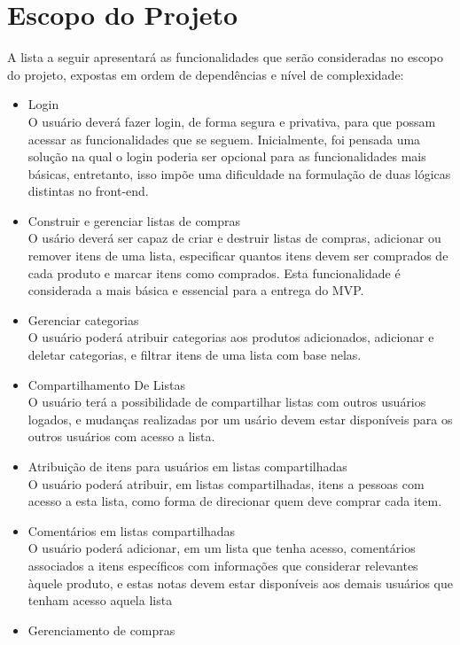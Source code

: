 \section{Escopo do Projeto}
A lista a seguir apresentará as funcionalidades que serão consideradas
no escopo do projeto, expostas em ordem de dependências e nível de
complexidade:
\begin{itemize}
\item Login\\
  O usuário deverá fazer login, de forma segura e privativa, para que
  possam acessar as funcionalidades que se seguem. Inicialmente, foi
  pensada uma solução na qual o login poderia ser opcional para as
  funcionalidades mais básicas, entretanto, isso impõe uma dificuldade
  na formulação de duas lógicas distintas no front-end.
\item Construir e gerenciar listas de compras\\
  O usário deverá ser capaz de criar e destruir listas de compras,
  adicionar ou remover itens de uma lista, especificar quantos itens
  devem ser comprados de cada produto e marcar itens como
  comprados. Esta funcionalidade é considerada a mais básica e
  essencial para a entrega do MVP.
\item Gerenciar categorias\\
  O usuário poderá atribuir categorias aos produtos adicionados,
  adicionar e deletar categorias, e filtrar itens de uma lista com
  base nelas.
\item Compartilhamento De Listas\\
  O usuário terá a possibilidade de compartilhar listas com outros
  usuários logados, e mudanças realizadas por um usário devem estar
  disponíveis para os outros usuários com acesso a lista.
\item Atribuição de itens para usuários em listas compartilhadas\\
  O usuário poderá atribuir, em listas compartilhadas, itens a pessoas
  com acesso a esta lista, como forma de direcionar quem deve comprar
  cada item.
\item Comentários em listas compartilhadas\\
  O usuário poderá adicionar, em um lista que tenha acesso,
  comentários associados a itens específicos com informações que
  considerar relevantes àquele produto, e estas notas devem estar
  disponíveis aos demais usuários que tenham acesso aquela lista
\item Gerenciamento de compras\\

\end{itemize}
